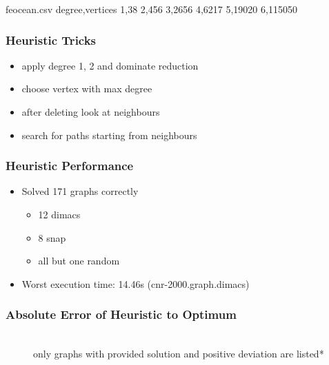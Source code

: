 \documentclass{beamer}[12pt]
\begin{document}
	\begin{filecontents*}{feocean.csv}
		degree,vertices
		1,38
		2,456
		3,2656
		4,6217
		5,19020
		6,115050
	\end{filecontents*}
	
	\begin{frame}
	\frametitle{Heuristic Tricks}
	\begin{itemize}
		\item apply degree 1, 2 and dominate reduction
		\item choose vertex with max degree
		\item after deleting look at neighbours
		\item search for paths starting from neighbours
	\end{itemize}
\end{frame}


\begin{frame}
\frametitle{Heuristic Performance}
\begin{itemize}
	\item Solved 171 graphs correctly
	\begin{itemize}
		\item 12 dimacs
		\item 8 snap
		\item all but one random
	\end{itemize}
	\item Worst execution time: 14.46s (cnr-2000.graph.dimacs)
\end{itemize}
\end{frame}

\begin{frame}
\frametitle{Absolute Error of Heuristic to Optimum}
\begin{figure}
\\
\small *only graphs with provided solution and positive deviation are listed*
\end{figure}

\end{frame}
\end{document}
